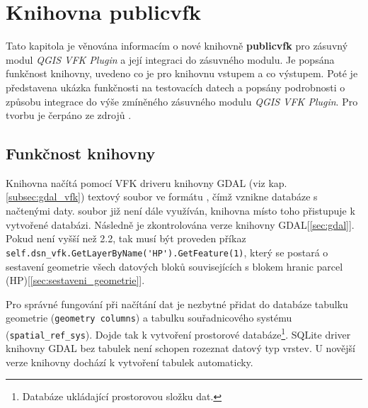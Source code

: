 \chapter{Knihovna publicvfk}
\label{4-plugin}
Tato kapitola je věnována informacím o nové knihovně
\textbf{publicvfk} pro zásuvný modul \textit{QGIS VFK Plugin} a její
integraci do zásuvného modulu. Je popsána funkčnost knihovny, uvedeno
co je pro knihovnu vstupem a co výstupem. Poté je představena ukázka
funkčnosti na testovacích datech a popsány podrobnosti o způsobu
integrace do výše zmíněného zásuvného modulu \textit{QGIS VFK
  Plugin}. Pro tvorbu je čerpáno ze zdrojů \cite{cookbook,
  ucebnicepython}.

\section{Funkčnost knihovny}
\label{sec:funknost_knihovny}
Knihovna načítá pomocí VFK driveru knihovny GDAL (viz
kap. \ref{subsec:gdal_vfk}) textový soubor ve formátu , čímž
vznikne  databáze s načtenými daty.  soubor již není
dále využíván, knihovna místo toho přistupuje k vytvořené 
databázi. Následně je zkontrolována verze knihovny
GDAL[\ref{sec:gdal}]. Pokud není vyšší než 2.2, tak musí být proveden
příkaz \verb|self.dsn_vfk.GetLayerByName('HP').GetFeature(1)|, který
se postará o sestavení geometrie všech datových bloků souvisejících s
blokem hranic parcel (HP)[\ref{sec:sestaveni_geometrie}].

Pro správné fungování při načítání dat je nezbytné přidat do databáze
tabulku geometrie (\verb|geometry columns|) a tabulku souřadnicového
systému (\verb|spatial_ref_sys|). Dojde tak k vytvoření prostorové
databáze\footnote{Databáze ukládající prostorovou složku dat.}. SQLite
driver knihovny GDAL bez tabulek není schopen rozeznat datový typ vrstev. U novější
verze knihovny dochází k vytvoření tabulek automaticky.

